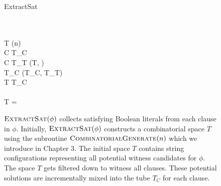 
\begin{figure}[htbp]
\begin{center}

	\begin{pseudocode}{ExtractSat}{\phi}
	
	\\
	\\
		T \GETS {}(n)\\	
		\FOREACH {} C  \phi \DO
			\BEGIN
				T_C \GETS \emptyset \\
			
				\FOREACH {} \ell {} C \DO
					\BEGIN 
						T_T \GETS {}(T, \ell) \\
						T_C \GETS {}(T_C, T_T)
					\END \\
				T \GETS T_C \\
			\END \\
			
		\IF T = \emptyset
			\THEN {}\\
	\end{pseudocode}


\caption{$\text{\sc ExtractSat}(\phi)$ collects satisfying Boolean literals from each clause in $\phi$.  Initially, $\text{\sc ExtractSat}(\phi)$ constructs a combinatorial space $T$ using the subroutine $\text{\sc CombinatorialGenerate}(n)$ which we introduce in Chapter 3.  The initial space $T$ contains string configurations representing all potential witness candidates for $\phi$.  The space $T$ gets filtered down to witness all clauses.  These potential solutions are incrementally mixed into the tube $T_C$ for each clause.  }
\label{extractSatAlgorithm}
\end{center}
\end{figure}
